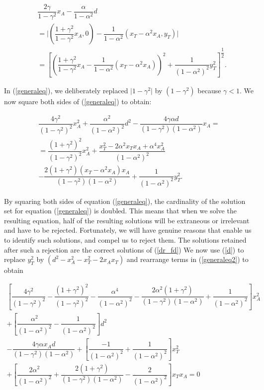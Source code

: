\documentclass[final,5p,times,twocolumn]{elsarticle}
\begin{document}
\begin{equation}
\begin{split}
&\dfrac{2\gamma}{1-\gamma^{2}}x_{A}-\dfrac{\alpha}{1-\alpha^{2}}d\\ 
&=\lvert(\dfrac{1+\gamma^{2}}{1-\gamma^{2}}x_{A},0)-\dfrac{1}{1-\alpha^{2}}(x_{T}-\alpha^{2}x_{A},y_{T})\rvert\\
&=[(\dfrac{1+\gamma^{2}}{1-\gamma^{2}}x_{A}-\dfrac{1}{1-\alpha^{2}}(x_{T}-\alpha^{2}x_{A}))^{2}+\dfrac{1}{(1-\alpha^{2})^{2}}y_{T}^2]^{\dfrac{1}{2}}.
\end{split}
\label{generaleq}
\end{equation}

In (\ref{generaleq}), we deliberately replaced $\lvert1-\gamma^{2}\rvert$ by $(1-\gamma^{2})$ because $\gamma<1$.
We now square both sides of (\ref{generaleq}) to obtain:

\begin{equation}
\begin{split}
\dfrac{4\gamma^{2}}{(1-\gamma^{2})^{2}}x_{A}^{2}
+\dfrac{\alpha^{2}}{(1-\alpha^{2})^{2}} d^{2}
-\dfrac{4\gamma\alpha d}{(1-\gamma^{2})(1-\alpha^{2})}x_{A}=\\
=\dfrac{(1+\gamma^{2})^{2}}{(1-\gamma^{2})^{2}}x_{A}^{2}
+\dfrac{x_{T}^{2}-2\alpha^{2} x_{T} x_{A}+\alpha^{4} x_{A}^{2} }{(1-\alpha^{2})^{2}}\\
-\dfrac{2(1+\gamma^{2})(x_{T}-\alpha^{2}x_{A})x_{A}}{(1-\gamma^{2})(1-\alpha^{2})}
+\dfrac{1}{(1-\alpha^{2})^{2}}y_{T}^{2}.
\end{split}
\label{generaleq2}
\end{equation}

By squaring both sides of equation (\ref{generaleq}), the cardinality of the solution set for equation (\ref{generaleq}) is doubled. This means that when we solve the resulting equation, half of the resulting solutions will be extraneous or irrelevant and have to be rejected. Fortunately, we will have genuine reasons that enable us to identify such solutions, and compel us to reject them. The solutions retained after such a rejection are the correct solutions of (\ref{dr_fd})
We now use (\ref{d}) to replace $y_{T}^{2}$ by $(d^{2}-x_{A}^{2}-x_{T}^{2}-2x_{A}x_{T})$ and rearrange terms in (\ref{generaleq2}) to obtain

\begin{equation}
\begin{split}
[\dfrac{4\gamma^{2}}{(1-\gamma^{2})^{2}}-\dfrac{(1+\gamma^{2})^{2}}{(1-\gamma^{2})^{2}}-\dfrac{\alpha^{4}}{(1-\alpha^{2})^{2}}-\dfrac{2\alpha^{2}(1+\gamma^{2})}{(1-\gamma^{2})(1-\alpha^{2})}+\dfrac{1}{(1-\alpha^{2})^{2}}]x_{A}^{2}\\
+[\dfrac{\alpha^{2}}{(1-\alpha^{2})^{2}}- \dfrac{1}{(1-\alpha^{2})^{2}}]d^{2}\\
-\dfrac{4\gamma\alpha x_{A}d}{(1-\gamma^{2})(1-\alpha^{2})}
+[\dfrac{-1}{(1-\alpha^{2})^{2}}+\dfrac{1}{(1-\alpha^{2})^{2}}]x_{T}^{2}\\
+[\dfrac{2\alpha^{2}}{(1-\alpha^{2})^{2}}+\dfrac{2(1+\gamma^{2})}{(1-\gamma^{2})(1-\alpha^{2})}-\dfrac{2}{(1-\alpha^{2})^{2}}]x_{T}x_{A}=0
\end{split}
\label{generaleq33}
\end{equation}
\end{document}
